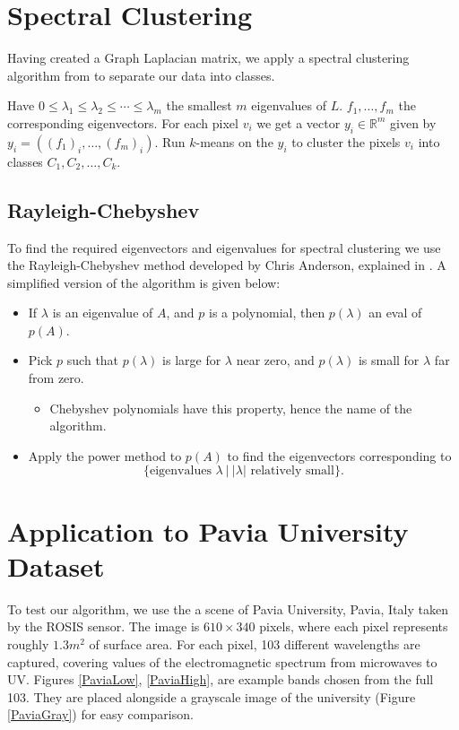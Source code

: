 \documentclass[12pt]{article}
\newcommand{\abs}[1]{\left\lvert#1\right\rvert}
\begin{document}

\section{Spectral Clustering} \label{sec:SpectralClustering}
Having created a Graph Laplacian matrix, we apply a spectral clustering algorithm from \cite{ref:SpectralClustering1} to separate our data into classes.

Have $0\leq\lambda_1\leq\lambda_2\leq\cdots\leq\lambda_m$ the smallest $m$ eigenvalues of $L$. $f_1,\ldots,f_m$ the corresponding eigenvectors. For each pixel $v_i$ we get a vector $y_i\in\mathbb{R}^m$ given by $y_i = ((f_1)_i,\ldots,(f_m)_i)$. Run $k$-means on the $y_i$ to cluster the pixels $v_i$ into classes $C_1,C_2,\ldots,C_k$.

\subsection{Rayleigh-Chebyshev}
To find the required eigenvectors and eigenvalues for spectral clustering we use the Rayleigh-Chebyshev method developed by Chris Anderson, explained in \cite{ref:RayleighChebyshev}. A simplified version of the algorithm is given below:

\begin{itemize}
\item If $\lambda$ is an eigenvalue of $A$, and $p$ is a polynomial, then $p(\lambda)$ an eval of $p(A)$.
\item Pick $p$ such that $p(\lambda)$ is large for $\lambda$ near zero, and $p(\lambda)$ is small for $\lambda$ far from zero.
\begin{itemize}
\item Chebyshev polynomials have this property, hence the name of the algorithm.
\end{itemize}
\item Apply the power method to $p(A)$ to find the eigenvectors corresponding to \[\{\text{eigenvalues }\lambda ~ \vert ~ \abs{\lambda} \text{ relatively small}\}.\]
\end{itemize}

\section{Application to Pavia University Dataset}\label{sec:results}

To test our algorithm, we use the a scene of Pavia University, Pavia, Italy\cite{ref:Pavia} taken by the ROSIS sensor\cite{ref:ROSISsensor}. The image is $610\times340$ pixels, where each pixel represents roughly $1.3m^2$ of surface area. For each pixel, 103 different wavelengths are captured, covering values of the electromagnetic spectrum from microwaves to UV. Figures \ref{PaviaLow}, \ref{PaviaHigh}, are example bands chosen from the full 103. They are placed alongside a grayscale image of the university (Figure \ref{PaviaGray}) for easy comparison. 
\end{document}
